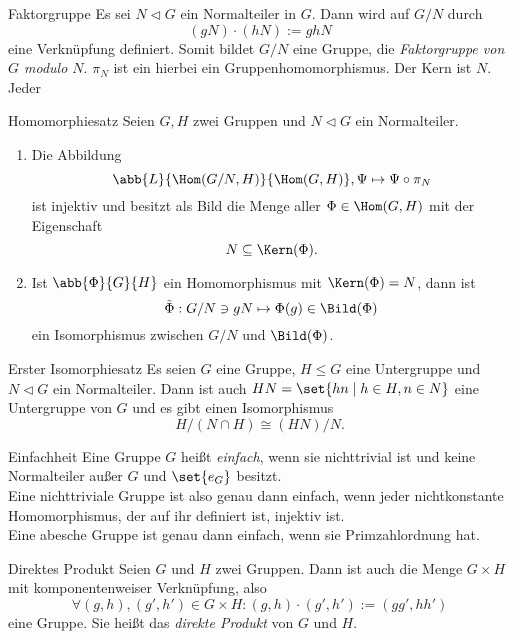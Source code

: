 \begin{karte}{Faktorgruppe}
    Es sei \(N\lhd G\) ein Normalteiler in \(G\). Dann wird auf \(G/N\) 
    durch 
    \[ (gN) \cdot (hN) := ghN \]
    eine Verknüpfung definiert. Somit bildet \(G/N\) eine Gruppe, 
    die \textit{Faktorgruppe von \(G\) modulo \(N\)}. \(\pi_N\) 
    ist ein hierbei ein Gruppenhomomorphismus. 
    Der Kern ist \(N\). Jeder 
\end{karte}

\begin{karte}{Homomorphiesatz}
    Seien \(G,H\) zwei Gruppen und \(N\lhd G\) ein Normalteiler. 
    \begin{enumerate}
        \item Die Abbildung 
        \[ \abb{L}{\Hom(G/N, H)}{\Hom(G,H)}, \Psi \mapsto \Psi \circ \pi_N \]
        ist injektiv und besitzt als Bild die Menge aller 
        \(\Phi \in \Hom(G,H)\) mit der Eigenschaft 
        \[ N\subseteq \Kern(\Phi). \]
        \item Ist \(\abb{\Phi}{G}{H}\) ein Homomorphismus mit \(\Kern(\Phi)=N\), 
        dann ist 
        \[ \tilde{\Phi}:G/N\ni gN \mapsto \Phi(g) \in \Bild(\Phi) \]
        ein Isomorphismus zwischen \(G/N\) und \(\Bild(\Phi)\).
    \end{enumerate}
\end{karte}

\begin{karte}{Erster Isomorphiesatz}
    Es seien \(G\) eine Gruppe, \(H\leq G\) eine Untergruppe und 
    \(N \lhd G\) ein Normalteiler. 
    Dann ist auch \(HN = \set{hn \;|\; h\in H, n\in N}\) eine Untergruppe 
    von \(G\) und es gibt einen Isomorphismus 
    \[ H/(N\cap H) \cong (HN)/N. \]
\end{karte}

\begin{karte}{Einfachheit}
    Eine Gruppe \(G\) heißt \textit{einfach}, wenn 
    sie nichttrivial ist und keine Normalteiler außer \(G\) und \(\set{e_G}\) besitzt. \\
    Eine nichttriviale Gruppe ist also genau dann einfach, wenn jeder nichtkonstante 
    Homomorphismus, der auf ihr definiert ist, injektiv ist.\\
    Eine abesche Gruppe ist genau dann einfach, wenn sie Primzahlordnung hat. 
\end{karte}

\begin{karte}{Direktes Produkt}
    Seien \(G\) und \(H\) zwei Gruppen. Dann ist auch die Menge 
    \(G \times H\) mit komponentenweiser Verknüpfung, also 
    \[ \forall (g,h), (g',h') \in G\times H: (g,h)\cdot (g',h') := (gg', hh') \] 
    eine Gruppe. Sie heißt das \textit{direkte Produkt} von \(G\) und \(H\).
\end{karte}

